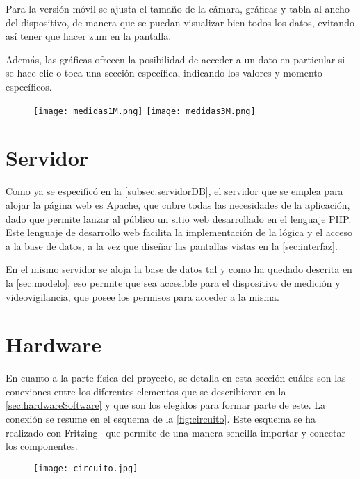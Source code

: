 Para la versión móvil se ajusta el tamaño de la cámara, gráficas y tabla al ancho del dispositivo, de manera que se puedan visualizar bien todos los datos, evitando así tener que hacer zum en la pantalla.
\pagebreak

Además, las gráficas ofrecen la posibilidad de acceder a un dato en particular si se hace clic o toca una sección específica, indicando los valores y momento específicos.
\begin{figure}[H]
	{\texttt{[image: medidas1M.png]}
		\texttt{[image: medidas3M.png]}}
\end{figure}

\section{Servidor}\label{sec:servidor}
Como ya se especificó en la \autoref{subsec:servidorDB}, el servidor que se emplea para alojar la página web es Apache, que cubre todas las necesidades de la aplicación, dado que permite lanzar al público un sitio web desarrollado en el lenguaje PHP. Este lenguaje de desarrollo web facilita la implementación de la lógica y el acceso a la base de datos, a la vez que diseñar las pantallas vistas en la \autoref{sec:interfaz}. 

En el mismo servidor se aloja la base de datos tal y como ha quedado descrita en la \autoref{sec:modelo}, eso permite que sea accesible para el dispositivo de medición y videovigilancia, que posee los permisos para acceder a la misma.
\pagebreak

\section{Hardware}\label{sec:hardware}
En cuanto a la parte física del proyecto, se detalla en esta sección cuáles son las conexiones entre los diferentes elementos que se describieron en la \autoref{sec:hardwareSoftware} y que son los elegidos para formar parte de este. La conexión se resume en el esquema de la \autoref{fig:circuito}. Este esquema se ha realizado con Fritzing~\cite{fritzing_fritzing_nodate} que permite de una manera sencilla importar y conectar los componentes.
\begin{figure}[H]
	{\texttt{[image: circuito.jpg]}}
\end{figure}

